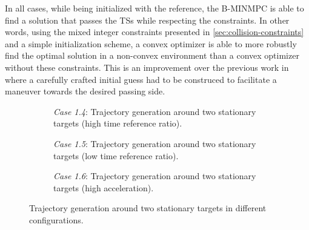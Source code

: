 In all cases, while being initialized with the reference, the B-MINMPC is able to find a solution that passes the TSs while respecting the constraints. In other words, using the mixed integer constraints presented in \cref{sec:collision-constraints} and a simple initialization scheme, a convex optimizer is able to more robustly find the optimal solution in a non-convex environment than a convex optimizer without these constraints. This is an improvement over the previous work in \cite{Thyri2022-MPC,prosjektoppgave} where a carefully crafted initial guess had to be construced to facilitate a maneuver towards the desired passing side.
\begin{figure}
    \centering
    \begin{subfigure}[b]{\textwidth}
        \centering
        
        \caption{\emph{Case 1.4}: Trajectory generation around two stationary targets (high time reference ratio).}
        \label{fig:stationary-target-5}
    \end{subfigure}
    \hfill
    \begin{subfigure}[b]{\textwidth}
        \centering
        
        \caption{\emph{Case 1.5}: Trajectory generation around two stationary targets (low time reference ratio).}
        \label{fig:stationary-target-6}
    \end{subfigure}
    \hfill
    \begin{subfigure}[b]{\textwidth}
        \centering
        
        \caption{\emph{Case 1.6}: Trajectory generation around two stationary targets (high acceleration).}
        \label{fig:stationary-target-7}
    \end{subfigure}
    \caption{Trajectory generation around two stationary targets in different configurations.}
    \label{fig:stationary-targets-subfigures-2}
\end{figure}


